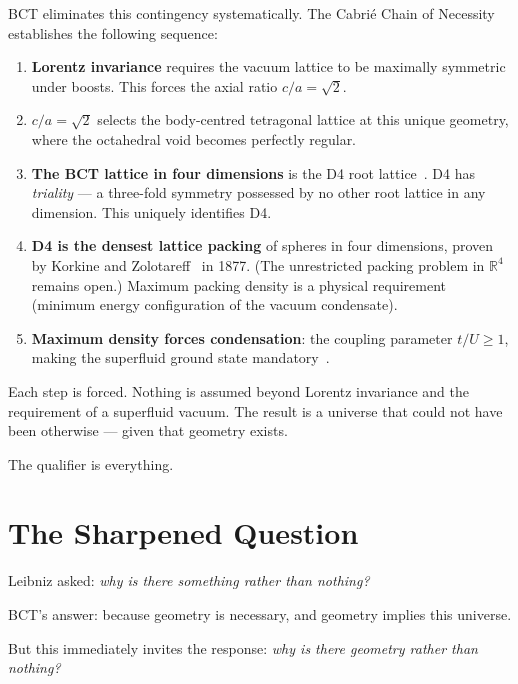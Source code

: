 \documentclass[aps,prl,twocolumn,superscriptaddress,floatfix]{revtex4-2}
\begin{document}
BCT eliminates this contingency systematically. The Cabri\'e Chain 
of Necessity~\cite{BCT_L128} establishes the following sequence:

\begin{enumerate}
\item \textbf{Lorentz invariance} requires the vacuum lattice to be 
maximally symmetric under boosts. This forces the axial ratio 
$c/a = \sqrt{2}$.

\item \textbf{$c/a = \sqrt{2}$} selects the body-centred tetragonal 
lattice at this unique geometry, where the octahedral void becomes 
perfectly regular.

\item \textbf{The BCT lattice in four dimensions} is the D4 root 
lattice~\cite{Conway1999}. D4 has \emph{triality} --- a three-fold 
symmetry possessed by no other root lattice in any dimension. This 
uniquely identifies D4.

\item \textbf{D4 is the densest lattice packing} of spheres in four 
dimensions, proven by Korkine and Zolotareff~\cite{korkine} in 1877. 
(The unrestricted packing problem in $\mathbb{R}^4$ remains open.) Maximum 
packing density is a physical requirement (minimum energy configuration 
of the vacuum condensate).

\item \textbf{Maximum density forces condensation}: the coupling 
parameter $t/U \geq 1$, making the superfluid ground state 
mandatory~\cite{BCT_AppJH}.
\end{enumerate}

Each step is forced. Nothing is assumed beyond Lorentz invariance and 
the requirement of a superfluid vacuum. The result is a universe that 
could not have been otherwise --- given that geometry exists.

The qualifier is everything.

\section{The Sharpened Question}

Leibniz asked: \emph{why is there something rather than nothing?}

BCT's answer: because geometry is necessary, and geometry implies this 
universe.

But this immediately invites the response: \emph{why is there geometry 
rather than nothing?}
\end{document}
